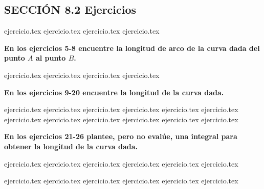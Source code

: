 
\subsection*{SECCIÓN 8.2 \quad Ejercicios}

\begin{enumerate}
    {ejercicio.tex}
{ejercicio.tex}
{ejercicio.tex}
{ejercicio.tex}
\end{enumerate}

\vspace{0.5cm}
\noindent\textbf{En los ejercicios 5-8 encuentre la longitud de arco de la curva dada del punto $A$ al punto $B$.}
\begin{enumerate}
    \setcounter{enumi}{4}
    {ejercicio.tex}
{ejercicio.tex}
{ejercicio.tex}
{ejercicio.tex}
\end{enumerate}

\vspace{0.5cm}
\noindent\textbf{En los ejercicios 9-20 encuentre la longitud de la curva dada.}
\begin{enumerate}
    \setcounter{enumi}{8}
    {ejercicio.tex}
{ejercicio.tex}
{ejercicio.tex}
{ejercicio.tex}
{ejercicio.tex}
{ejercicio.tex}
{ejercicio.tex}
{ejercicio.tex}
{ejercicio.tex}
{ejercicio.tex}
{ejercicio.tex}
{ejercicio.tex}
\end{enumerate}

\vspace{0.5cm}
\noindent\textbf{En los ejercicios 21-26 plantee, pero no evalúe, una integral para obtener la longitud de la curva dada.}
\begin{enumerate}
    \setcounter{enumi}{20}
    {ejercicio.tex}
{ejercicio.tex}
{ejercicio.tex}
{ejercicio.tex}
{ejercicio.tex}
{ejercicio.tex}
\end{enumerate}

\vspace{0.5cm}
\begin{enumerate}
    \setcounter{enumi}{26}
    {ejercicio.tex}
{ejercicio.tex}
{ejercicio.tex}
{ejercicio.tex}
{ejercicio.tex}
{ejercicio.tex}
\end{enumerate}

